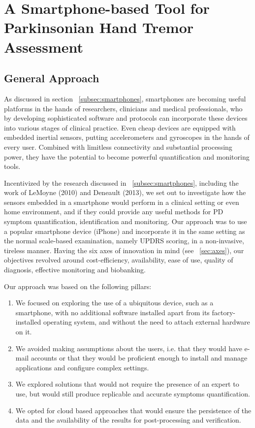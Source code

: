 \chapter{A Smartphone-based Tool for Parkinsonian Hand Tremor Assessment}
\label{ch:smartphone}
\pagestyle{fancy}
\fancyhf{}
\fancyhead[OC]{\leftmark}
\fancyhead[EC]{\rightmark}
\cfoot{\thepage}


\section{General Approach}
\label{sec:genApproach}
As discussed in section ~\ref{subsec:smartphones}, smartphones are becoming useful platforms in the hands of researchers, clinicians and medical professionals, who by developing sophisticated software and protocols can incorporate these devices into various stages of clinical practice. Even cheap devices are equipped with embedded inertial sensors, putting accelerometers and gyroscopes in the hands of every user. Combined with limitless connectivity and substantial processing power, they have the potential to become powerful quantification and monitoring tools.

Incentivized by the research discussed in ~\ref{subsec:smartphones}, including the work of LeMoyne (2010) and Deneault (2013), we set out to investigate how the sensors embedded in a smartphone would perform in a clinical setting or even home environment, and if they could provide any useful methods for \gls{PD} symptom quantification, identification and monitoring. Our approach was to use a popular smartphone device (iPhone) and incorporate it in the same setting as the normal scale-based examination, namely \gls{UPDRS} scoring, in a non-invasive, tireless manner. Having the six axes of innovation in mind (see ~\ref{sec:axes}), our objectives revolved around cost-efficiency, availability, ease of use, quality of diagnosis, effective monitoring and biobanking. 

Our approach was based on the following pillars: 

\begin{enumerate}
\item We focused on exploring the use of a ubiquitous device, such as a smartphone, with no additional software installed apart from its factory-installed operating system, and without the need to attach external hardware on it. 
\item We avoided making assumptions about the users, i.e. that they would have e-mail accounts or that they would be proficient enough to install and manage applications and configure complex settings. 
\item We explored solutions that would not require the presence of an expert to use, but would still produce replicable and accurate symptoms quantification. 
\item We opted for cloud based approaches that would ensure the persistence of the data and the availability of the results for post-processing and verification. 
\end{enumerate}

